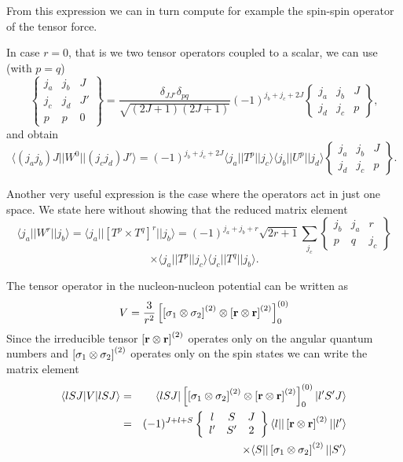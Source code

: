 \documentclass[graybox,sectrefs,envcountresetchap,open=right]{svmonodo}
\begin{document}
From this expression we can in turn compute for example the spin-spin operator of the tensor force.


In case $r=0$, that is we two tensor operators coupled to a scalar, we can use (with $p=q$) 
\[
\left\{\begin{array}{ccc} j_a & j_b& J \\ j_c & j_d & J' \\ p &p & 0\end{array}\right\}=\frac{\delta_{JJ'} \delta_{pq}}{\sqrt{(2J+1)(2J+1)}} (-1)^{j_b+j_c+2J} \begin{Bmatrix} j_a & j_b & J\\ j_d & j_c & p \end{Bmatrix},
\]
and obtain
\[
\langle (j_aj_b)J||W^{0}||(j_cj_d)J'\rangle=(-1)^{j_b+j_c+2J}\langle j_a||T^p||j_c\rangle\langle j_b||U^p||j_d\rangle \begin{Bmatrix} j_a & j_b & J\\ j_d & j_c & p \end{Bmatrix}.
\]



Another very useful expression is the case where the operators act in just one space. We state here without 
showing that the reduced matrix element
\[
\langle j_a||W^{r}||j_b\rangle=\langle j_a||\left[T^p\times T^q\right]^{r}||j_b\rangle= (-1)^{j_a+j_b+r}\sqrt{2r+1} \sum_{j_c}\begin{Bmatrix} j_b & j_a & r\\ p & q & j_c \end{Bmatrix}
\]
\[
\times \langle j_a||T^p||j_c\rangle \langle j_c||T^q||j_b\rangle.
\]



The tensor operator in 
the nucleon-nucleon potential can be written as  
\[
V=\frac{3}{r^{2}}\left[ \left[ {\bf \sigma}_1 \otimes {\bf \sigma}_2\right]^
{(2)} \otimes\left[{\bf r} \otimes {\bf r} \right]^{(2)}\right]^{(0)}_0
\]
Since the irreducible tensor  
$\left[{\bf r} \otimes {\bf r} \right]^{(2)}$
operates  only on the angular quantum numbers and
$\left[{\bf \sigma}_1 \otimes {\bf \sigma}_2\right]^{(2)}$ 
operates  only on 
the spin states we can write the matrix element 
\begin{eqnarray*}
\langle lSJ\vert V\vert lSJ\rangle & = &
\langle lSJ \vert\left[ \left[{\bf \sigma}_1 \otimes {\bf \sigma}_2\right]^{(2)} \otimes
\left[{\bf r} \otimes {\bf r} \right]^{(2)}\right]^{(0)}_0\vert l'S'J\rangle \\
&  = &
(-1)^{J+l+S}
\left\{\begin{array}{ccc} l&S&J \\ l'&S'&2\end{array}\right\}
\langle l \vert\vert\left[{\bf r} \otimes {\bf r} \right]^{(2)} \vert \vert l'\rangle\\
& &
\times \langle S\vert\vert\left[{\bf \sigma}_1 \otimes {\bf \sigma}_2\right]^{(2)} \vert\vert S'\rangle
\end{eqnarray*}
\end{document}
